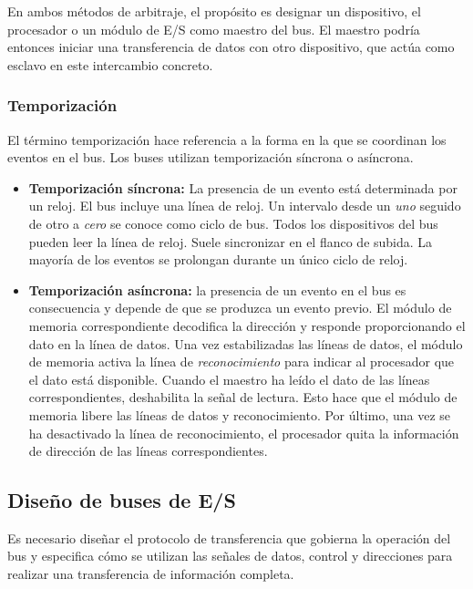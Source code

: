 En ambos métodos de arbitraje, el propósito es designar un dispositivo, el procesador o un módulo de E/S como maestro del bus. El maestro podría entonces iniciar una transferencia de datos con otro dispositivo, que actúa como esclavo en este intercambio concreto.

\subsubsection*{Temporización}

El término temporización hace referencia a la forma en la que se coordinan los eventos en el bus. Los buses utilizan temporización síncrona o asíncrona.

\begin{itemize}
  \item \textbf{Temporización síncrona:} La presencia de un evento está determinada por un reloj. El bus incluye una línea de reloj. Un intervalo desde un \textit{uno} seguido de otro a \textit{cero} se conoce como ciclo de bus. Todos los dispositivos del bus pueden leer la línea de reloj. Suele sincronizar en el flanco de subida. La mayoría de los eventos se prolongan durante un único ciclo de reloj.
  \item \textbf{Temporización asíncrona:} la presencia de un evento en el bus es consecuencia y depende de que se produzca un evento previo. El módulo de memoria correspondiente decodifica la dirección y responde proporcionando el dato en la línea de datos. Una vez estabilizadas las líneas de datos, el módulo de memoria activa la línea de \textit{reconocimiento} para indicar al procesador que el dato está disponible. Cuando el maestro ha leído el dato de las líneas correspondientes, deshabilita la señal de lectura. Esto hace que el módulo de memoria libere las líneas de datos y reconocimiento. Por último, una vez se ha desactivado la línea de reconocimiento, el procesador quita la información de dirección de las líneas correspondientes.
\end{itemize}

\subsection{Diseño de buses de E/S}

Es necesario diseñar el protocolo de transferencia que gobierna la operación del bus y especifica cómo se utilizan las señales de datos, control y direcciones para realizar una transferencia de información completa.

